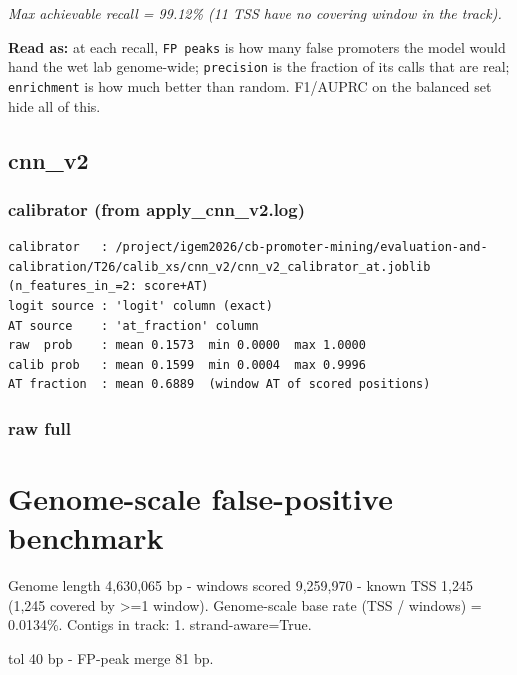 \documentclass[10pt]{article}
\begin{document}
{\itshape Max achievable recall = 99.12\% (11 TSS have no covering window in the track).}

\textbf{Read as:} at each recall, \texttt{FP peaks} is how many false promoters the model would hand the wet lab genome-wide; \texttt{precision} is the fraction of its calls that are real; \texttt{enrichment} is how much better than random. F1/AUPRC on the balanced set hide all of this.

\subsection*{cnn\_v2}

\subsubsection*{calibrator (from apply\_cnn\_v2.log)}
\begin{verbatim}
calibrator   : /project/igem2026/cb-promoter-mining/evaluation-and-calibration/T26/calib_xs/cnn_v2/cnn_v2_calibrator_at.joblib  (n_features_in_=2: score+AT)
logit source : 'logit' column (exact)
AT source    : 'at_fraction' column
raw  prob    : mean 0.1573  min 0.0000  max 1.0000
calib prob   : mean 0.1599  min 0.0004  max 0.9996
AT fraction  : mean 0.6889  (window AT of scored positions)
\end{verbatim}

\subsubsection*{raw \textperiodcentered{} full}
\section*{Genome-scale false-positive benchmark}

Genome length 4,630,065 bp - windows scored 9,259,970 - known TSS 1,245 (1,245 covered by >=1 window). Genome-scale base rate (TSS / windows) = 0.0134\%. Contigs in track: 1. strand-aware=True.

tol 40 bp - FP-peak merge 81 bp.

\begin{center}
\end{center}
\end{document}
